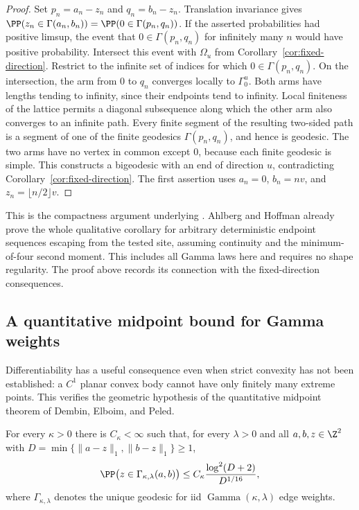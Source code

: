 \begin{proof}
Set $p_n=a_n-z_n$ and $q_n=b_n-z_n$. Translation invariance gives
$\PP(z_n\in\Gamma(a_n,b_n))=
\PP(0\in\Gamma(p_n,q_n))$.
If the asserted probabilities had positive limsup,
the event that $0\in\Gamma(p_n,q_n)$ for infinitely many $n$ would
have positive probability. Intersect this event with $\Omega_u$ from
Corollary~\ref{cor:fixed-direction}.
Restrict to the infinite set of indices for which
$0\in\Gamma(p_n,q_n)$. On the intersection, the arm from $0$ to $q_n$ converges locally to
$\Gamma_0^u$. Both arms have lengths tending to infinity, since their
endpoints tend to infinity. Local finiteness of the lattice permits a
diagonal subsequence along which the other arm also converges to an
infinite path. Every finite segment of the resulting two-sided path is
a segment of one of the finite geodesics $\Gamma(p_n,q_n)$, and hence
is geodesic. The two arms have no vertex in common except $0$, because
each finite geodesic is simple. This constructs a bigeodesic with an
end of direction $u$, contradicting Corollary~\ref{cor:fixed-direction}.
The first assertion uses $a_n=0$, $b_n=nv$, and
$z_n=\lfloor n/2\rfloor v$.
\end{proof}

This is the compactness argument underlying \cite[Theorem~2.1]{DH2017}.
Ahlberg and Hoffman \cite[Theorem~2.1]{AH2019} already prove the whole
qualitative corollary for arbitrary deterministic endpoint sequences
escaping from the tested site, assuming continuity and the
minimum-of-four second moment. This includes all Gamma laws here and
requires no shape regularity. The proof above records its connection
with the fixed-direction consequences.

\subsection{A quantitative midpoint bound for Gamma weights}

Differentiability has a useful consequence even when strict convexity
has not been established: a $C^1$ planar convex body cannot have only
finitely many extreme points. This verifies the geometric hypothesis
of the quantitative midpoint theorem of Dembin, Elboim, and Peled.

\begin{corollary}
\label{cor:gamma-quantitative-midpoint}
For every $\kappa>0$ there is $C_\kappa<\infty$ such that, for every
$\lambda>0$ and all $a,b,z\in\Z^2$ with
$D=\min\{\lVert a-z\rVert_1,\lVert b-z\rVert_1\}\geq1$,
\[
 \PP\bigl(z\in\Gamma_{\kappa,\lambda}(a,b)\bigr)
 \leq C_\kappa\frac{\log^2(D+2)}{D^{1/16}},
\]
where $\Gamma_{\kappa,\lambda}$ denotes the unique geodesic for
iid $\operatorname{Gamma}(\kappa,\lambda)$ edge weights.
\end{corollary}

